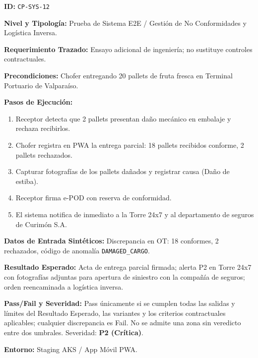 \par\noindent\textbf{ID:} \texttt{C\allowbreak{}P\allowbreak{}-\allowbreak{}S\allowbreak{}Y\allowbreak{}S\allowbreak{}-\allowbreak{}1\allowbreak{}2\allowbreak{}}\par
\par\noindent\textbf{Nivel y Tipología:} Prueba de Sistema E2E / Gestión de No Conformidades y Logística Inversa.\par
\par\noindent\textbf{Requerimiento Trazado:} Ensayo adicional de ingeniería; no sustituye controles contractuales.\par
\par\noindent\textbf{Precondiciones:} Chofer entregando 20 pallets de fruta fresca en Terminal Portuario de Valparaíso.\par
\par\noindent\textbf{Pasos de Ejecución:} \par
\begin{enumerate}
\item Receptor detecta que 2 pallets presentan daño mecánico en embalaje y rechaza recibirlos.
\item Chofer registra en PWA la entrega parcial: 18 pallets recibidos conforme, 2 pallets rechazados.
\item Capturar fotografías de los pallets dañados y registrar causa (Daño de estiba).
\item Receptor firma e-POD con reserva de conformidad.
\item El sistema notifica de inmediato a la Torre 24x7 y al departamento de seguros de Curimón S.A.
\end{enumerate}
\par\noindent\textbf{Datos de Entrada Sintéticos:} Discrepancia en OT: 18 conformes, 2 rechazados, código de anomalía \texttt{D\allowbreak{}A\allowbreak{}M\allowbreak{}A\allowbreak{}G\allowbreak{}E\allowbreak{}D\allowbreak{}\_\allowbreak{}C\allowbreak{}A\allowbreak{}R\allowbreak{}G\allowbreak{}O\allowbreak{}}.\par
\par\noindent\textbf{Resultado Esperado:} Acta de entrega parcial firmada; alerta P2 en Torre 24x7 con fotografías adjuntas para apertura de siniestro con la compañía de seguros; orden reencaminada a logística inversa.\par
\par\noindent\textbf{Pass/Fail y Severidad:} Pass únicamente si se cumplen todas las salidas y límites del Resultado Esperado, las variantes y los criterios contractuales aplicables; cualquier discrepancia es Fail. No se admite una zona sin veredicto entre dos umbrales. Severidad: \textbf{P2 (Crítica)}.\par
\par\noindent\textbf{Entorno:} Staging AKS / App Móvil PWA.\par






